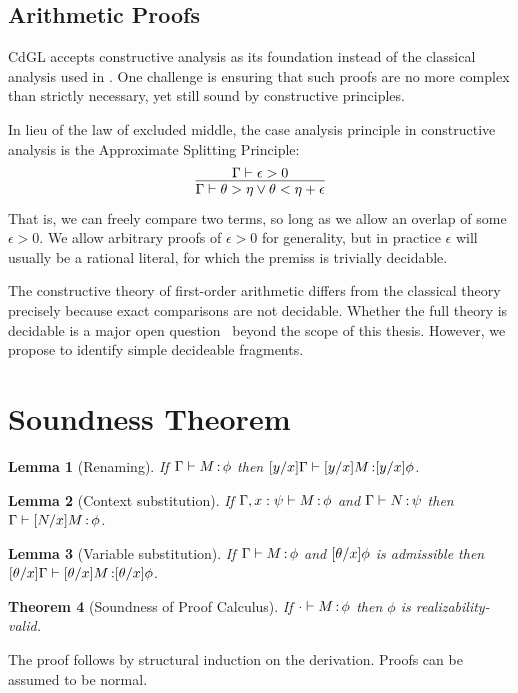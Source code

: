 \documentclass[12pt]{cmuthesis}
\newtheorem{theorem}{Theorem}
\newtheorem{lemma}[theorem]{Lemma}
\theoremstyle{definition}
\theoremstyle{remark}
\newcommand{\CdGL}{\textsf{CdGL}\xspace}
\newcommand{\G}{\Gamma}
\begin{document}
\subsection{Arithmetic Proofs}
\label{sec:arith-proof}
\CdGL accepts constructive analysis as its foundation instead of the classical analysis used in \dGL.
One challenge is ensuring that such proofs are no more complex than strictly necessary, yet still sound by constructive principles.

In lieu of the law of excluded middle, the case analysis principle in constructive analysis is the Approximate Splitting Principle:
\[\infer{\Gamma \vdash \theta > \eta \lor \theta < \eta + \epsilon}{\Gamma \vdash \epsilon > 0}\]
That is, we can freely compare two terms, so long as we allow an overlap of some $\epsilon > 0$.
We allow arbitrary proofs of $\epsilon > 0$ for generality, but in practice $\epsilon$ will usually be a rational literal, for which the premiss is trivially decidable.

The constructive theory of first-order arithmetic differs from the classical theory precisely because exact comparisons are not decidable.
Whether the full theory is decidable is a major open question~\cite{constructiveRealAlgebra} beyond the scope of this thesis.
However, we propose to identify simple decideable fragments.

\section{Soundness Theorem}
\begin{lemma}[Renaming]
  If $\proves{\G}{M}{\phi}$ then $\proves{\esub{\G}{x}{y}}{\esub{M}{x}{y}}{\esub{\phi}{x}{y}}$.
\end{lemma}
\begin{lemma}[Context substitution]
  If $\proves{\G,x:\psi}{M}{\phi}$ and $\proves{\G}{N}{\psi}$ then $\proves{\G}{\esub{M}{x}{N}}{\phi}$.
\end{lemma}
\begin{lemma}[Variable substitution]
  If $\proves{\G}{M}{\phi}$ and $[{\theta}/{x}]{\phi}$ is admissible then $\proves{\esub{\G}{x}{\theta}}{\esub{M}{x}{\theta}}{\esub{\phi}{x}{\theta}}$.
\end{lemma}
\begin{theorem}[Soundness of Proof Calculus]
  If $\cdot\allowbreak\vdash M \allowbreak \mathop{:} \phi$ then $\phi$ is realizability-valid.
\end{theorem}
The proof follows by structural induction on the derivation.
Proofs can be assumed to be normal.
\end{document}
